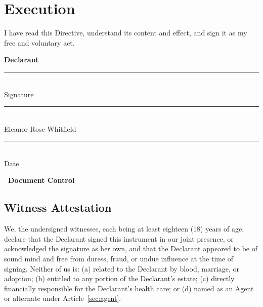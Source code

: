 \section{Execution}
\label{sec:execution}

I have read this Directive, understand its content and effect, and sign it as my free and voluntary act.

\vspace{6pt}
\noindent
\begin{minipage}[t]{0.46\linewidth}
{\sffamily\bfseries\color{willnavy} Declarant}\\[10pt]
\rule{0.9\linewidth}{0.5pt}\\[2pt]
Signature\\[5pt]
\rule{0.9\linewidth}{0.5pt}\\[2pt]
Eleanor Rose Whitfield\\[4pt]
\rule{0.9\linewidth}{0.5pt}\\[2pt]
Date
\end{minipage}\hfill
\begin{minipage}[t]{0.46\linewidth}
{\sffamily\bfseries\color{willnavy} \faFile\ Document Control}\\[4pt]
\end{minipage}
\par

\subsection{Witness Attestation}
We, the undersigned witnesses, each being at least eighteen (18) years of age, declare that the Declarant signed this instrument in our joint presence, or acknowledged the signature as her own, and that the Declarant appeared to be of sound mind and free from duress, fraud, or undue influence at the time of signing. Neither of us is: (a) related to the Declarant by blood, marriage, or adoption; (b) entitled to any portion of the Declarant's estate; (c) directly financially responsible for the Declarant's health care; or (d) named as an Agent or alternate under Article~\ref{sec:agent}.

